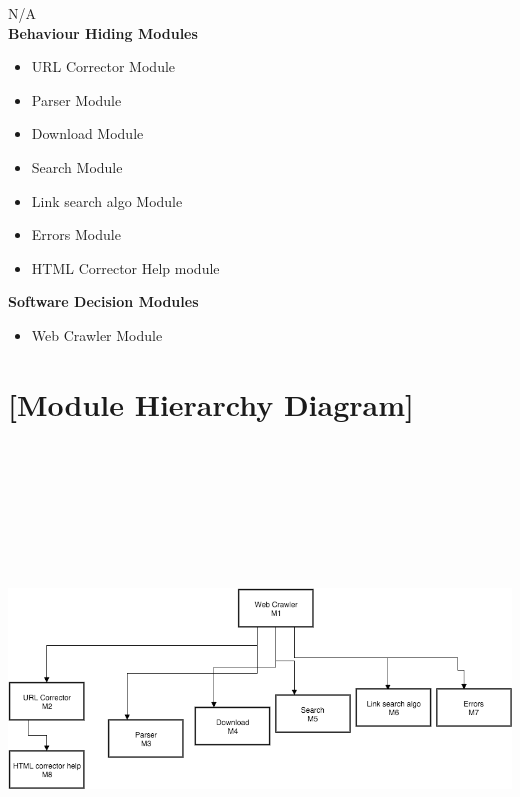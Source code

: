 \documentclass[titlepage]{article}
\newcommand{\group}[1]{{\leavevmode\color{red}[#1]}}
\begin{document}
N/A\\

\textbf{Behaviour Hiding Modules}

\begin{itemize}
\item URL Corrector Module\\
\item Parser Module\\
\item Download Module\\
\item Search Module\\
\item Link search algo Module\\
\item Errors Module\\
\item HTML Corrector Help module

\end{itemize}

\textbf{Software Decision Modules}

\begin{itemize}
\item{Web Crawler Module}\\
\end{itemize}



\section{\group{Module Hierarchy Diagram}}
\includegraphics[width=19cm, height=13cm]{Hierarchy}
\end{document}
